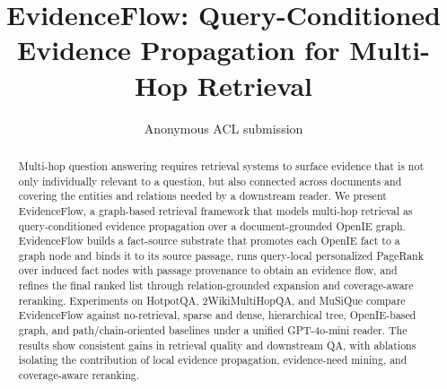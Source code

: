 \documentclass[11pt]{article}
\title{EvidenceFlow: Query-Conditioned Evidence Propagation for Multi-Hop Retrieval}
\author{Anonymous ACL submission}
\newcommand{\methodname}{EvidenceFlow}
\begin{document}
\maketitle

\begin{abstract}
Multi-hop question answering requires retrieval systems to surface
evidence that is not only individually relevant to a question, but also
connected across documents and covering the entities and relations needed
by a downstream reader. We present \methodname{}, a graph-based retrieval
framework that models multi-hop retrieval as query-conditioned evidence
propagation over a document-grounded OpenIE graph. \methodname{} builds a
fact-source substrate that promotes each OpenIE fact to a graph node and
binds it to its source passage, runs query-local personalized PageRank
over induced fact nodes with passage provenance to obtain an evidence
flow, and refines the final ranked list through relation-grounded
expansion and coverage-aware reranking. Experiments on HotpotQA,
2WikiMultiHopQA, and MuSiQue compare \methodname{} against
no-retrieval, sparse and dense, hierarchical tree, OpenIE-based graph,
and path/chain-oriented baselines under a unified GPT-4o-mini reader.
The results show consistent gains in
retrieval quality and downstream QA, with ablations isolating the
contribution of local evidence propagation, evidence-need mining,
and coverage-aware reranking.
\end{abstract}











\appendix

\end{document}
